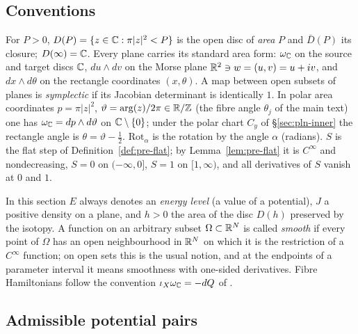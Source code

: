 \subsection*{Conventions}
For $P>0$, $D(P)=\{z\in\mathbb{C}:\pi|z|^2<P\}$ is the open disc of \emph{area} $P$ and $\bar D(P)$ its
closure; $D(\infty)=\mathbb{C}$. Every plane carries its standard area form: $\omega_{\mathbb{C}}$ on the source and target
discs $\mathbb{C}$, $du\wedge dv$ on the Morse plane $\mathbb{R}^2\ni w=(u,v)=u+iv$, and $dx\wedge d\theta$ on the
rectangle coordinates $(x,\theta)$. A map between open subsets of planes is \emph{symplectic} if its
Jacobian determinant is identically $1$. In polar area coordinates $p=\pi|z|^2$,
$\vartheta=\arg(z)/2\pi\in\mathbb{R}/\mathbb{Z}$ (the fibre angle $\theta_j$ of the main text) one has
$\omega_{\mathbb{C}}=dp\wedge d\vartheta$ on $\mathbb{C}\setminus\{0\}$; under the polar chart $C_y$ of \S\ref{sec:pln-inner}
the rectangle angle is $\theta=\vartheta-\frac12$. $\mathrm{Rot}_\alpha$ is the rotation by the angle $\alpha$
(radians). $S$ is the flat step of Definition~\ref{def:pre-flat}; by Lemma~\ref{lem:pre-flat} it is
$C^\infty$ and nondecreasing, $S=0$ on $(-\infty,0]$, $S=1$ on $[1,\infty)$, and all derivatives of $S$
vanish at $0$ and $1$.

In this section $E$ always denotes an \emph{energy level} (a value of a potential), $J$ a positive
density on a plane, and $h>0$ the area of the disc $D(h)$ preserved by the isotopy. A function on an
arbitrary subset $\Omega\subset\mathbb{R}^N$ is called \emph{smooth} if every point of $\Omega$ has an open
neighbourhood in $\mathbb{R}^N$ on which it is the restriction of a $C^\infty$ function; on open sets this is the
usual notion, and at the endpoints of a parameter interval it means smoothness with one-sided derivatives.
Fibre Hamiltonians follow the convention $\iota_X\omega_{\mathbb{C}}=-dQ$ of .

\subsection{Admissible potential pairs}\label{sec:pln-pairs}

